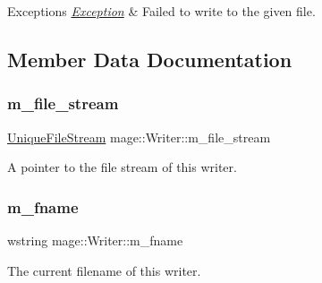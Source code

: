 \begin{DoxyExceptions}{Exceptions}
{\em \mbox{\hyperlink{classmage_1_1_exception}{Exception}}} & Failed to write to the given file. \\
\hline
\end{DoxyExceptions}


\subsection{Member Data Documentation}
\mbox{\label{classmage_1_1_writer_ac4884215d1b547e990633474bf61c470}} 
\subsubsection{\texorpdfstring{m\+\_\+file\+\_\+stream}{m\_file\_stream}}
{\footnotesize\ttfamily \mbox{\hyperlink{namespacemage_a0ee1bd45ad7dbb3dc8c8e1770e3538d4}{Unique\+File\+Stream}} mage\+::\+Writer\+::m\+\_\+file\+\_\+stream\hspace{0.3cm}{\ttfamily [private]}}

A pointer to the file stream of this writer. \mbox{\label{classmage_1_1_writer_afa271ee47897d4961e9d62132d8faeb5}} 
\subsubsection{\texorpdfstring{m\+\_\+fname}{m\_fname}}
{\footnotesize\ttfamily wstring mage\+::\+Writer\+::m\+\_\+fname\hspace{0.3cm}{\ttfamily [private]}}

The current filename of this writer. 
